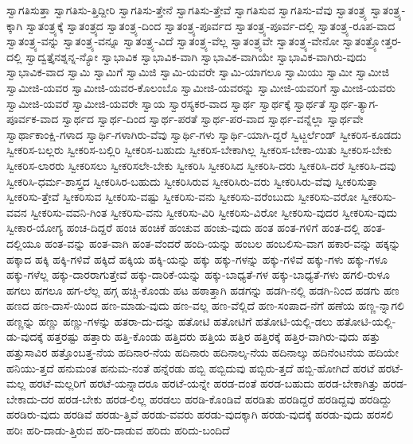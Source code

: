 {ಸ್ವಾಗತಿಸುತ್ತಾ
ಸ್ವಾಗತಿಸು-ತ್ತಿದ್ದೀರಿ
ಸ್ವಾಗತಿಸು-ತ್ತೇನೆ
ಸ್ವಾಗತಿಸು-ತ್ತೇವೆ
ಸ್ವಾಗತಿಸುವ
ಸ್ವಾಗತಿಸು-ವೆವು
ಸ್ವಾತಂತ್ರ್ಯ
ಸ್ವಾತಂತ್ರ್ಯ-ಕ್ಕಾಗಿ
ಸ್ವಾತಂತ್ರ್ಯಕ್ಕೆ
ಸ್ವಾತಂತ್ರ್ಯದ
ಸ್ವಾತಂತ್ರ್ಯ-ದಿಂದ
ಸ್ವಾತಂತ್ರ್ಯ-ಪೂರ್ವದ
ಸ್ವಾತಂತ್ರ್ಯ-ಪೂರ್ವ-ದಲ್ಲಿ
ಸ್ವಾತಂತ್ರ್ಯ-ರೂಪ-ವಾದ
ಸ್ವಾತಂತ್ರ್ಯ-ವನ್ನು
ಸ್ವಾತಂತ್ರ್ಯ-ವನ್ನೂ
ಸ್ವಾತಂತ್ರ್ಯ-ವಿದೆ
ಸ್ವಾತಂತ್ರ್ಯ-ವೆಲ್ಲ
ಸ್ವಾತಂತ್ರ್ಯವೇ
ಸ್ವಾತಂತ್ರ್ಯ-ವೇನೋ
ಸ್ವಾತಂತ್ರ್ಯೋತ್ತರ-ದಲ್ಲಿ
ಸ್ವಾದ್ವತ್ತೈನಶ್ನನ್ನ-ನ್ಯೋ
ಸ್ವಾಭಾವಿಕ
ಸ್ವಾಭಾವಿಕ-ವಾಗಿ
ಸ್ವಾಭಾವಿಕ-ವಾಗಿಯೇ
ಸ್ವಾಭಾವಿಕ-ವಾಗಿರು-ವುದು
ಸ್ವಾಭಾವಿಕ-ವಾದ
ಸ್ವಾಮಿ
ಸ್ವಾಮಿಗೆ
ಸ್ವಾಮಿಜಿ
ಸ್ವಾಮಿ-ಯವರೇ
ಸ್ವಾಮಿ-ಯಾಗಲೂ
ಸ್ವಾಮಿಯು
ಸ್ವಾಮೀ
ಸ್ವಾಮೀಜಿ
ಸ್ವಾಮೀಜಿ-ಯವರ
ಸ್ವಾಮೀಜಿ-ಯವರ-ಕೊಲಂಬೊ
ಸ್ವಾಮೀಜಿ-ಯವರನ್ನು
ಸ್ವಾಮೀಜಿ-ಯವರಿಗೆ
ಸ್ವಾಮೀಜಿ-ಯವರು
ಸ್ವಾಮೀಜಿ-ಯವರೆ
ಸ್ವಾಮೀಜಿ-ಯವರೇ
ಸ್ವಾಯ
ಸ್ವಾರಸ್ಯಕರ-ವಾದ
ಸ್ವಾರ್ಥ
ಸ್ವಾರ್ಥಕ್ಕೆ
ಸ್ವಾರ್ಥತೆ
ಸ್ವಾರ್ಥ-ತ್ಯಾಗ-ಪೂರ್ವಕ-ವಾದ
ಸ್ವಾರ್ಥದ
ಸ್ವಾರ್ಥ-ದಿಂದ
ಸ್ವಾರ್ಥ-ಪರತೆ
ಸ್ವಾರ್ಥ-ಪರ-ವಾದ
ಸ್ವಾರ್ಥ-ವನ್ನೆಲ್ಲಾ
ಸ್ವಾರ್ಥವೇ
ಸ್ವಾರ್ಥಾಕಾಂಕ್ಷಿ-ಗಳಾದ
ಸ್ವಾರ್ಥಿ-ಗಳಾಗಿರು-ವೆವು
ಸ್ವಾರ್ಥಿ-ಗಳು
ಸ್ವಾರ್ಥಿ-ಯಾಗಿ-ದ್ದರೆ
ಸ್ವಿಟ್ಜರ್ಲೆಂಡ್
ಸ್ವೀಕರಿಸ-ಕೂಡದು
ಸ್ವೀಕರಿಸ-ಬಲ್ಲರು
ಸ್ವೀಕರಿಸ-ಬಲ್ಲಿರಿ
ಸ್ವೀಕರಿಸ-ಬಹುದು
ಸ್ವೀಕರಿಸ-ಬೇಕಾಗಿಲ್ಲ
ಸ್ವೀಕರಿಸ-ಬೇಕಾ-ಯಿತು
ಸ್ವೀಕರಿಸ-ಬೇಕು
ಸ್ವೀಕರಿಸ-ಲಾರರು
ಸ್ವೀಕರಿಸಲು
ಸ್ವೀಕರಿಸಲೇ-ಬೇಕು
ಸ್ವೀಕರಿಸಿ
ಸ್ವೀಕರಿಸಿದ
ಸ್ವೀಕರಿಸಿ-ದರು
ಸ್ವೀಕರಿಸಿ-ದರೆ
ಸ್ವೀಕರಿಸಿ-ದವು
ಸ್ವೀಕರಿಸಿ-ಧರ್ಮ-ಶಾಸ್ತ್ರದ
ಸ್ವೀಕರಿಸಿರ-ಬಹುದು
ಸ್ವೀಕರಿಸಿರುವ
ಸ್ವೀಕರಿಸಿರು-ವರು
ಸ್ವೀಕರಿಸಿರು-ವೆವು
ಸ್ವೀಕರಿಸುತ್ತಾ
ಸ್ವೀಕರಿಸು-ತ್ತೇವೆ
ಸ್ವೀಕರಿಸುವ
ಸ್ವೀಕರಿಸು-ವಷ್ಟು
ಸ್ವೀಕರಿಸು-ವನು
ಸ್ವೀಕರಿಸು-ವರೆಂಬುದು
ಸ್ವೀಕರಿಸು-ವರೋ
ಸ್ವೀಕರಿಸು-ವವನ
ಸ್ವೀಕರಿಸು-ವವನಿ-ಗಿಂತ
ಸ್ವೀಕರಿಸು-ವನು
ಸ್ವೀಕರಿಸು-ವಿರಿ
ಸ್ವೀಕರಿಸು-ವಿರೋ
ಸ್ವೀಕರಿಸು-ವುದರ
ಸ್ವೀಕರಿಸು-ವುದು
ಸ್ವೀಕಾರ-ಯೋಗ್ಯ
ಹಂಚ-ದಿದ್ದರೆ
ಹಂಚಿ
ಹಂಚಿಕೆ
ಹಂಚುವ
ಹಂಚು-ವುದು
ಹಂತ
ಹಂತ-ಗಳಿಗೆ
ಹಂತ-ದಲ್ಲಿ
ಹಂತ-ದಲ್ಲಿಯೂ
ಹಂತ-ವನ್ನು
ಹಂತ-ವಾಗಿ
ಹಂತ-ವೆಂದರೆ
ಹಂದಿ-ಯನ್ನು
ಹಂಬಲ
ಹಂಬಲಿಸು-ವಾಗ
ಹಕಾರ-ವನ್ನು
ಹಕ್ಕನ್ನು
ಹಕ್ಕಾದ
ಹಕ್ಕಿ
ಹಕ್ಕಿ-ಗಳಿವೆ
ಹಕ್ಕಿದೆ
ಹಕ್ಕಿಯ
ಹಕ್ಕಿ-ಯನ್ನು
ಹಕ್ಕು
ಹಕ್ಕು-ಗಳನ್ನು
ಹಕ್ಕು-ಗಳಿವೆ
ಹಕ್ಕು-ಗಳು
ಹಕ್ಕು-ಗಳೂ
ಹಕ್ಕು-ಗಳೆಲ್ಲ
ಹಕ್ಕು-ದಾರರಾಗುತ್ತೇವೆ
ಹಕ್ಕು-ದಾರಿಕೆ-ಯನ್ನು
ಹಕ್ಕು-ಬಾಧ್ಯತೆ-ಗಳ
ಹಕ್ಕು-ಬಾಧ್ಯತೆ-ಗಳು
ಹಗಲಿ-ರುಳೂ
ಹಗಲು
ಹಗಲೂ
ಹಗ-ಲೆಲ್ಲ
ಹಗ್ಗ
ಹಚ್ಚಿ-ಕೊಂಡು
ಹಟ
ಹಠಾತ್ತಾಗಿ
ಹಡಗನ್ನು
ಹಡಗಿ-ನಲ್ಲಿ
ಹಡಗಿ-ನಿಂದ
ಹಡಗು
ಹಣ
ಹಣದ
ಹಣ-ದಾಸೆ-ಯಿಂದ
ಹಣ-ಮಾಡು-ವುದು
ಹಣ-ವಲ್ಲ
ಹಣ-ವೆಲ್ಲಿದೆ
ಹಣ-ಸಂಪಾದ-ನೆಗೆ
ಹಣೆಯ
ಹಣ್ಣ-ನ್ನಾಗಲಿ
ಹಣ್ಣನ್ನು
ಹಣ್ಣು
ಹಣ್ಣು-ಗಳನ್ನು
ಹತರಾ-ದು-ದನ್ನು
ಹತೋಟಿ
ಹತೋಟಿಗೆ
ಹತೋಟಿ-ಯಲ್ಲಿ-ಡಲು
ಹತೋಟಿ-ಯಲ್ಲಿ-ಡು-ವುದಕ್ಕೆ
ಹತ್ತರಷ್ಟು
ಹತ್ತಾರು
ಹತ್ತಿ-ಕೊಂಡು
ಹತ್ತಿದರು
ಹತ್ತಿಯ
ಹತ್ತಿರ
ಹತ್ತಿರಕ್ಕೆ
ಹತ್ತಿರ-ವಾಗಿರು-ವುದು
ಹತ್ತು
ಹತ್ತುಸಾವಿರ
ಹತ್ತೊಂಬತ್ತ-ನೆಯ
ಹದಿನಾರ-ನೆಯ
ಹದಿನಾರು
ಹದಿನಾಲ್ಕ-ನೆಯ
ಹದಿನಾಲ್ಕು
ಹದಿನೆಂಟನೆಯ
ಹದಿಯೇ
ಹನಿಯು-ತ್ತದೆ
ಹನುಮಂತ
ಹನುಮ-ನಂತೆ
ಹನ್ನೆರಡು
ಹಬ್ಬಿ
ಹಬ್ಬಿದುವು
ಹಬ್ಬಿರು-ತ್ತದೆ
ಹಬ್ಬಿ-ಹೋಗಿದೆ
ಹರಟೆ
ಹರಟೆ-ಮಲ್ಲ
ಹರಟೆ-ಮಲ್ಲರಿಗೆ
ಹರಟೆ-ಯನ್ನಾದರೂ
ಹರಟೆ-ಯನ್ನೇ
ಹರಡ-ದಂತೆ
ಹರಡ-ಬಹುದು
ಹರಡ-ಬೇಕಾಗಿತ್ತು
ಹರಡ-ಬೇಕಾದು-ದರ
ಹರಡ-ಬೇಕು
ಹರಡ-ಲಿಲ್ಲ
ಹರಡಲು
ಹರಡಿ-ಕೊಂಡಿವೆ
ಹರಡಿತು
ಹರಡಿದ್ದರೆ
ಹರಡಿದ್ದವು
ಹರಡಿದ್ದು
ಹರಡಿರು-ವುದು
ಹರಡಿವೆ
ಹರಡು-ತ್ತಿವೆ
ಹರಡು-ವವರು
ಹರಡು-ವುದಕ್ಕಾಗಿ
ಹರಡು-ವುದಕ್ಕೆ
ಹರಡು-ವುದು
ಹರಸಲಿ
ಹರಿಃ
ಹರಿ-ದಾಡು-ತ್ತಿರುವ
ಹರಿ-ದಾಡುವ
ಹರಿದು
ಹರಿದು-ಬಂದಿದೆ
}
